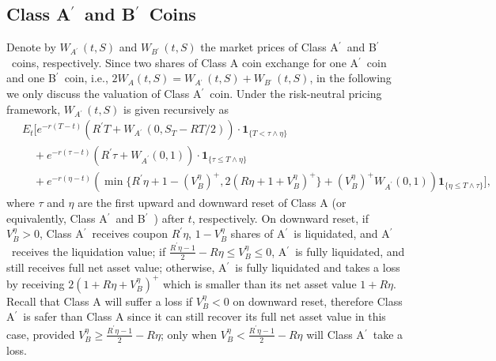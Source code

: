 \documentclass[11pt]{article}%
\numberwithin{equation}{section}
\theoremstyle{plain}
\newcommand{\Ap}{A\ensuremath{^\prime}~}
\newcommand{\Bp}{B\ensuremath{^\prime}~}
\begin{document}
\subsection{\texorpdfstring{Class \Ap and \Bp Coins}{Lg}}
Denote by $W_{\Ap}(t,S)$ and $W_{\Bp}(t,S)$ the market prices of Class \Ap and \Bp coins, respectively. Since two shares of Class A coin exchange for one \Ap coin and one \Bp coin, i.e., $2W_{A}(t,S)=W_{\Ap}(t,S)+W_{\Bp}(t,S)$, in the following we only discuss the valuation of Class \Ap coin. Under the risk-neutral pricing framework,  $W_{\Ap}(t,S)$ is given recursively as
\begin{equation}    \label{VAL3}
\begin{split}
 &~ E_{t}\Bigg[e^{-r(T-t)}(R^\prime T+W_{\Ap}(0,S_T-RT/2))\cdot\mathbf{1}_{\{T<\tau\land\eta\}}\\
 &~\quad +e^{-r(\tau-t)}(R^\prime\tau+W_{A^\prime}(0,1))\cdot\mathbf{1}_{\{\tau\le T\land \eta\}}\\
 &~ \quad + e^{-r(\eta-t)}\left(\min\{R^\prime\eta+1-(V_{B}^{\eta})^+,2(R\eta+1+V_B^{\eta})^+\}+(V_{B}^{\eta})^+W_{A^\prime}(0,1)\right) \mathbf{1}_{\{\eta\le T\land\tau\}}\Bigg],
\end{split}
\end{equation}
where $\tau$ and $\eta$ are the first upward and downward reset of Class A (or equivalently, Class \Ap and \Bp) after $t$, respectively. On downward reset, if $V_B^{\eta}>0$, Class \Ap receives coupon $R^\prime\eta$, $1-V_B^{\eta}$ shares of \Ap is liquidated, and \Ap receives the liquidation value; if $\frac{R^\prime\eta-1}{2}-R\eta\le V_B^{\eta}\le 0$, \Ap is fully liquidated, and still receives full net asset value; otherwise, \Ap is fully liquidated and takes a loss by receiving $2(1+R\eta+V_B^{\eta})^+$ which is smaller than its net asset value $1+R\eta$. Recall that Class A will suffer a loss if $V_B^\eta<0$ on downward reset, therefore Class \Ap is safer than Class A since it can still recover its full net asset value in this case, provided $V_B^{\eta}\ge \frac{R^\prime\eta-1}{2}-R\eta$; only when $V_B^{\eta}< \frac{R^\prime\eta-1}{2}-R\eta$ will Class \Ap take a loss.
\end{document}
